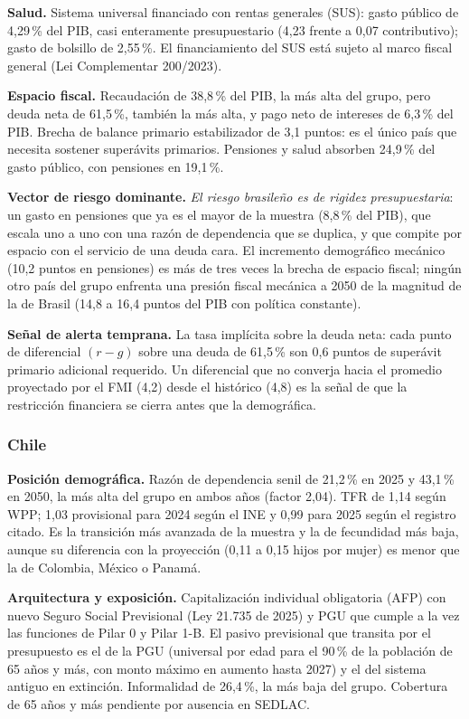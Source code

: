 \documentclass[12pt, letterpaper]{article}
\begin{document}
\textbf{Salud.} Sistema universal financiado con rentas generales (SUS): gasto
público de 4,29\,\% del PIB, casi enteramente presupuestario (4,23 frente a 0,07
contributivo); gasto de bolsillo de 2,55\,\%. El financiamiento del SUS está sujeto
al marco fiscal general (Lei Complementar 200/2023).

\textbf{Espacio fiscal.} Recaudación de 38,8\,\% del PIB, la más alta del grupo,
pero deuda neta de 61,5\,\%, también la más alta, y pago neto de intereses de
6,3\,\% del PIB. Brecha de balance primario estabilizador de 3,1 puntos: es el
único país que necesita sostener superávits primarios. Pensiones y salud absorben 24,9\,\% del gasto público, con pensiones en
19,1\,\%.

\textbf{Vector de riesgo dominante.} \emph{El riesgo brasileño es de rigidez
presupuestaria}: un gasto en pensiones que ya es el mayor de la
muestra (8,8\,\% del PIB), que escala uno a uno con una razón de dependencia que
se duplica, y que compite por espacio con el servicio de una deuda cara. El
incremento demográfico mecánico (10,2 puntos en pensiones) es más de tres veces la
brecha de espacio fiscal; ningún otro país del grupo enfrenta una presión fiscal
mecánica a 2050 de la magnitud de la de Brasil (14,8 a 16,4 puntos del PIB con política constante).

\textbf{Señal de alerta temprana.} La tasa implícita sobre la deuda neta: cada
punto de diferencial $(r-g)$ sobre una deuda de 61,5\,\% son 0,6 puntos de
superávit primario adicional requerido. Un diferencial que no converja hacia el
promedio proyectado por el FMI (4,2) desde el histórico (4,8) es la señal de que la
restricción financiera se cierra antes que la demográfica.

\subsubsection{Chile}

\textbf{Posición demográfica.} Razón de dependencia senil de 21,2\,\% en 2025 y
43,1\,\% en 2050, la más alta del grupo en ambos años (factor 2,04). TFR de 1,14
según WPP; 1,03 provisional para 2024 según el INE y 0,99 para 2025 según el
registro citado. Es la transición más avanzada de la muestra y la de fecundidad
más baja, aunque su diferencia con la proyección (0,11 a 0,15 hijos por mujer) es
menor que la de Colombia, México o Panamá.

\textbf{Arquitectura y exposición.} Capitalización individual obligatoria (AFP)
con nuevo Seguro Social Previsional (Ley 21.735 de 2025) y PGU que cumple a la vez
las funciones de Pilar 0 y Pilar 1-B. El pasivo previsional que transita por el
presupuesto es el de la PGU (universal por edad para el 90\,\% de la población de
65 años y más, con monto máximo en aumento hasta 2027) y el del sistema antiguo en
extinción. Informalidad de 26,4\,\%, la más baja del grupo. Cobertura de 65 años
y más pendiente por ausencia en SEDLAC.
\end{document}
